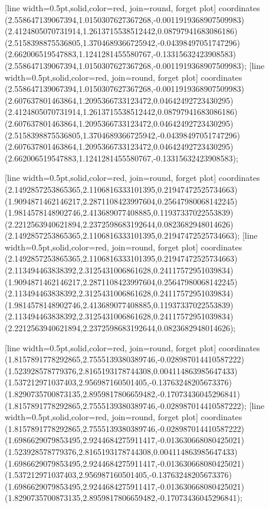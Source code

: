 [line width=0.5pt,solid,color=red, join=round, forget plot] coordinates {(2.558647139067394,1.0150307627367268,-0.0011919368907509983) (2.4124805070731914,1.2613715538512442,0.08797941683086186) (2.5158398875536805,1.3704689366725942,-0.04398497051747296) (2.662006519547883,1.1241281455580767,-0.13315632423908583) (2.558647139067394,1.0150307627367268,-0.0011919368907509983)};
[line width=0.5pt,solid,color=red, join=round, forget plot] coordinates {(2.558647139067394,1.0150307627367268,-0.0011919368907509983) (2.607637801463864,1.2095366733123472,0.04642492723430295) (2.4124805070731914,1.2613715538512442,0.08797941683086186) (2.607637801463864,1.2095366733123472,0.04642492723430295) (2.5158398875536805,1.3704689366725942,-0.04398497051747296) (2.607637801463864,1.2095366733123472,0.04642492723430295) (2.662006519547883,1.1241281455580767,-0.13315632423908583)};

[line width=0.5pt,solid,color=red, join=round, forget plot] coordinates {(2.1492857253865365,2.1106816333101395,0.21947472525734663) (1.9094871462146217,2.2871108423997604,0.25647980068142245) (1.9814578148902746,2.413689077408885,0.11937337022553839) (2.2212563940621894,2.2372598683192644,0.0823682948014626) (2.1492857253865365,2.1106816333101395,0.21947472525734663)};
[line width=0.5pt,solid,color=red, join=round, forget plot] coordinates {(2.1492857253865365,2.1106816333101395,0.21947472525734663) (2.113494463838392,2.3125431006861628,0.24117572951039834) (1.9094871462146217,2.2871108423997604,0.25647980068142245) (2.113494463838392,2.3125431006861628,0.24117572951039834) (1.9814578148902746,2.413689077408885,0.11937337022553839) (2.113494463838392,2.3125431006861628,0.24117572951039834) (2.2212563940621894,2.2372598683192644,0.0823682948014626)};

[line width=0.5pt,solid,color=red, join=round, forget plot] coordinates {(1.8157891778292865,2.7555139380389746,-0.028987014410587222) (1.523928578779376,2.8165193178744308,0.004114863985647433) (1.537212971037403,2.956987160501405,-0.13763248205673376) (1.8290735700873135,2.8959817806659482,-0.17073436045296841) (1.8157891778292865,2.7555139380389746,-0.028987014410587222)};
[line width=0.5pt,solid,color=red, join=round, forget plot] coordinates {(1.8157891778292865,2.7555139380389746,-0.028987014410587222) (1.6986629079853495,2.9244684275911417,-0.013630668080425021) (1.523928578779376,2.8165193178744308,0.004114863985647433) (1.6986629079853495,2.9244684275911417,-0.013630668080425021) (1.537212971037403,2.956987160501405,-0.13763248205673376) (1.6986629079853495,2.9244684275911417,-0.013630668080425021) (1.8290735700873135,2.8959817806659482,-0.17073436045296841)};


